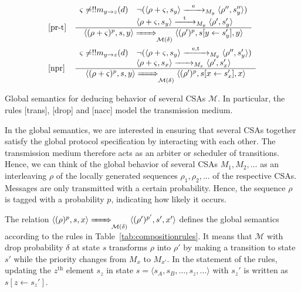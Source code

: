 \documentclass{sig-alternate}
\renewcommand{\d}{\delta}
\newcommand{\M}{\mathcal{M}}
\newcommand{\tab}[1]{Table~\ref{tab:#1}}
\newcommand{\figvspace}{\vspace{-0.2in}}
\begin{document}
\begin{table}[bt!]
\begin{equation*}
\begin{array}{ll}
\text{[pr-t]} &
\frac{
\begin{array}{cl}
\varsigma \neq !!m_{y \rightarrow z}(d) & \neg(\langle \rho + \varsigma, s_y \rangle \smallstep{\mathrm{e}}{y} \langle \rho'', s_y'' \rangle) \\ & \langle \rho + \varsigma, s_y \rangle \smallstep{\mathrm{t}}{y} \langle \rho', s_y' \rangle
\end{array}}{
\begin{array}{c}
\langle (\rho + \varsigma)^p, s, y \rangle \bigstep{} \langle (\rho')^p, s[y \leftarrow s_y'], y \rangle
\end{array}} \\[\lsp]

\text{[npr]} &
\frac{
\begin{array}{cl}
\varsigma \neq !!m_{y \rightarrow z}(d) & \neg(\langle \rho + \varsigma, s_y \rangle \smallstep{\mathrm{e, t}}{y} \langle \rho'', s_y' \rangle) \\ & \langle \rho + \varsigma, s_x \rangle \smallstep{}{x} \langle \rho', s_x' \rangle
\end{array}}{
\begin{array}{c}
\langle (\rho + \varsigma)^p, s, y \rangle \bigstep{} \langle (\rho')^p, s[x \leftarrow s_x'], x \rangle
\end{array}}
		
\end{array}
\end{equation*}
\caption{Global semantics for deducing behavior of several CSAs $\M$. In particular, the rules [trans], [drop] and [nacc] model the transmission medium.}
\label{tab:compositionrules}
\figvspace
\end{table}




In the global semantics, we are interested in ensuring that several CSAs together satisfy the global protocol specification by interacting with each other. The transmission medium therefore acts as an arbiter or scheduler of transitions. Hence, we can think of the global behavior of several CSAs $M_1, M_2, \ldots$ as an interleaving $\rho$ of the locally generated sequences $\rho_1, \rho_2, \ldots$ of the respective CSAs. Messages are only transmitted with a certain probability. Hence, the sequence $\rho$ is tagged with a probability $p$, indicating how likely it occurs.


The relation $\langle (\rho)^p, s, x \rangle \bigstep{} \langle (\rho')^{p'}, s', x' \rangle$  defines the global semantics according to the rules in \tab{compositionrules}. It means that $\M$ with drop probability $\d$ at state $s$ transforms $\rho$ into $\rho'$ by making a transition to state $s'$ while the priority changes from $M_x$ to $M_{x'}$. In the statement of the rules, updating the $z^{\mathrm{th}}$ element $s_z$ in state $s = \langle s_A, s_B, \ldots, s_z, \ldots \rangle$ with $s_z'$ is written as $s[z \leftarrow s_z']$.
\end{document}
